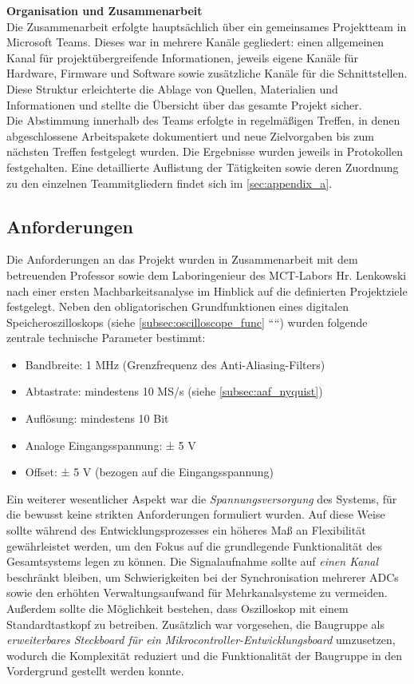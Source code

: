 \documentclass[a4paper, portrait, 12pt]{scrartcl} %
\begin{document}
\textbf{Organisation und Zusammenarbeit}\\
Die Zusammenarbeit erfolgte hauptsächlich über ein gemeinsames Projektteam in Microsoft Teams. Dieses war in mehrere Kanäle gegliedert: einen allgemeinen Kanal für projektübergreifende Informationen, jeweils eigene Kanäle für Hardware, Firmware und Software sowie zusätzliche Kanäle für die Schnittstellen. Diese Struktur erleichterte die Ablage von Quellen, Materialien und Informationen und stellte die Übersicht über das gesamte Projekt sicher.\\
Die Abstimmung innerhalb des Teams erfolgte in regelmäßigen Treffen, in denen abgeschlossene Arbeitspakete dokumentiert und neue Zielvorgaben bis zum nächsten Treffen festgelegt wurden. Die Ergebnisse wurden jeweils in Protokollen festgehalten. Eine detaillierte Auflistung der Tätigkeiten sowie deren Zuordnung zu den einzelnen Teammitgliedern findet sich im  \ref{sec:appendix_a}.
\pagebreak

\subsection{Anforderungen}
Die Anforderungen an das Projekt wurden in Zusammenarbeit mit dem betreuenden Professor sowie dem Laboringenieur des MCT-Labors Hr. Lenkowski nach einer ersten Machbarkeitsanalyse im Hinblick auf die definierten Projektziele festgelegt. Neben den obligatorischen Grundfunktionen eines digitalen Speicheroszilloskops (siehe \autoref{subsec:oscilloscope_func} ````) wurden folgende zentrale technische Parameter bestimmt:
\begin{itemize}
\item Bandbreite: 1 MHz (Grenzfrequenz des Anti-Aliasing-Filters)
\item Abtastrate: mindestens 10 MS/s (siehe \autoref{subsec:aaf_nyquist})
\item Auflösung: mindestens 10 Bit
\item Analoge Eingangsspannung: ± 5 V
\item Offset: ± 5 V (bezogen auf die Eingangsspannung)
\end{itemize}

Ein weiterer wesentlicher Aspekt war die \emph{Spannungsversorgung} des Systems, für die bewusst keine strikten Anforderungen formuliert wurden. Auf diese Weise sollte während des Entwicklungsprozesses ein höheres Maß an Flexibilität gewährleistet werden, um den Fokus auf die grundlegende Funktionalität des Gesamtsystems legen zu können. Die Signalaufnahme sollte auf \emph{einen Kanal} beschränkt bleiben, um Schwierigkeiten bei der Synchronisation mehrerer ADCs sowie den erhöhten Verwaltungsaufwand für Mehrkanalsysteme zu vermeiden. Außerdem sollte die Möglichkeit bestehen, dass Oszilloskop mit einem Standardtastkopf zu betreiben. Zusätzlich war vorgesehen, die Baugruppe als \emph{erweiterbares Steckboard für ein Mikrocontroller-Entwicklungsboard} umzusetzen, wodurch die Komplexität reduziert und die Funktionalität der Baugruppe in den Vordergrund gestellt werden konnte.\\
\end{document}
